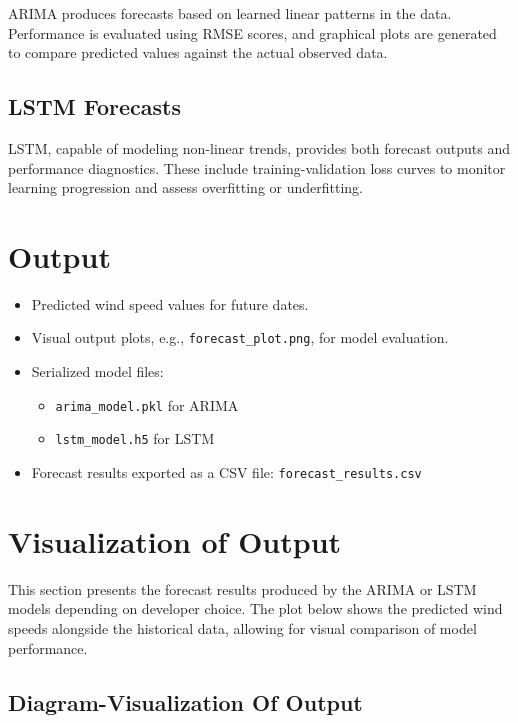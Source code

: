 ARIMA produces forecasts based on learned linear patterns in the data. Performance is evaluated using RMSE scores, and graphical plots are generated to compare predicted values against the actual observed data.

\subsection{LSTM Forecasts}

LSTM, capable of modeling non-linear trends, provides both forecast outputs and performance diagnostics. These include training-validation loss curves to monitor learning progression and assess overfitting or underfitting.
\section {Output}
\begin{itemize}
	\item Predicted wind speed values for future dates.
	\item Visual output plots, e.g., \texttt{forecast\_plot.png}, for model evaluation.
	\item Serialized model files:
	\begin{itemize}
		\item \texttt{arima\_model.pkl} for ARIMA
		\item \texttt{lstm\_model.h5} for LSTM
	\end{itemize}
	\item Forecast results exported as a CSV file: \texttt{forecast\_results.csv}
\end{itemize}

\section{Visualization of Output}

This section presents the forecast results produced by the ARIMA or LSTM models depending on developer choice. The plot below shows the predicted wind speeds alongside the historical data, allowing for visual comparison of model performance.

\subsection{Diagram-Visualization Of Output}

